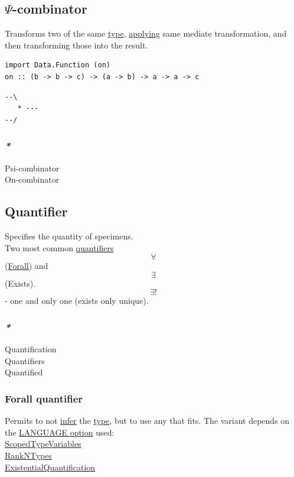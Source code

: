 \documentclass[11pt]{article}
\begin{document}
\subsection{\label{org29eeebd}\(\Psi\)-combinator}
\label{sec:orgacecc2d}
Transforms two of the same \hyperref[orgc4aea2f]{type}, \hyperref[org6b37c0b]{applying} same mediate transformation, and then transforming those into the result.\\
\begin{verbatim}
import Data.Function (on)
on :: (b -> b -> c) -> (a -> b) -> a -> a -> c
\end{verbatim}

\begin{verbatim}
--\
   * ---
--/
\end{verbatim}

\subsubsection{\emph{*}}
\label{sec:org2fb283e}

\label{orgabe1dbf}Psi-combinator\\
\label{org8142ec0}On-combinator\\

\subsection{\label{org357bc41}Quantifier}
\label{sec:orgbb46049}
Specifies the quantity of specimens.\\

Two most common \hyperref[org56c9794]{quantifiers} $$ \forall $$ (\hyperref[orga0ddc78]{Forall}) and $$ \exists $$ (Exists).\\
$$ \exists ! $$ - one and only one (exists only unique).\\

\subsubsection{\emph{*}}
\label{sec:orgcbe971e}

\label{orgfcc3eee}Quantification\\
\label{org56c9794}Quantifiers\\
\label{org818c50e}Quantified\\

\subsubsection{\label{org3d99962}Forall quantifier}
\label{sec:org1327e65}
Permits to not \hyperref[org6da926a]{infer} the \hyperref[orgc4aea2f]{type}, but to use any that fits. The variant depends on the \hyperref[orgc822b41]{LANGUAGE option} used:\\
\hyperref[org98e1643]{ScopedTypeVariables}\\
\hyperref[orga7c1c21]{RankNTypes}\\
\hyperref[org63de444]{ExistentialQuantification}\\
\end{document}
